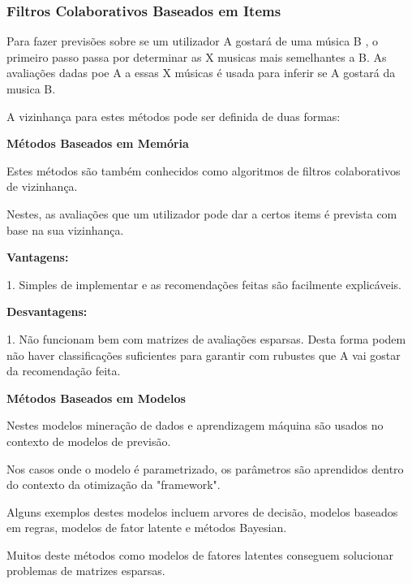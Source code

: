 \hfill
\subsubsection{ Filtros Colaborativos Baseados em Items}
\hfill
 \par Para fazer previsões sobre se um utilizador A gostará de uma música B , o primeiro passo passa por determinar as X musicas mais semelhantes a B. As avaliações dadas poe A a essas X músicas é usada para inferir se A gostará da musica B.\newline


\par A vizinhança para estes métodos pode ser definida de duas formas:

\begin{center}
\normalsize{\bfseries Métodos Baseados em Memória}\hfill
\end{center}
 \par Estes métodos são também conhecidos como algoritmos de filtros colaborativos de vizinhança.
 \par Nestes, as avaliações que um utilizador pode dar a certos items é prevista com base na sua vizinhança.\newline


\textbf{Vantagens:}\hfill
\hfill
\par 1. Simples de implementar e as recomendações feitas são facilmente explicáveis.\newline


\textbf{Desvantagens:}\hfill
\hfill
\par 1. Não funcionam bem com matrizes de avaliações esparsas. Desta forma podem não haver classificações suficientes para garantir com rubustes que A vai gostar da recomendação feita.\newline

\begin{center}
\normalsize{\bfseries Métodos Baseados em Modelos}\hfill
\end{center}
\hfill
\par Nestes modelos mineração de dados e aprendizagem máquina são usados no contexto de modelos de previsão.
\par Nos casos onde o modelo é parametrizado, os parâmetros são aprendidos dentro do contexto da otimização da "framework".
\par Alguns exemplos destes modelos incluem arvores de decisão, modelos baseados em regras, modelos de fator latente e métodos Bayesian.
\par Muitos deste métodos como modelos de fatores latentes conseguem solucionar problemas de matrizes esparsas.

